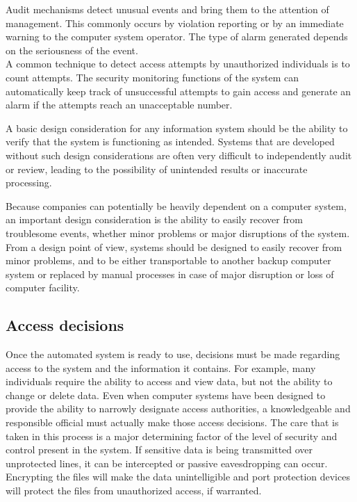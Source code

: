 \begin{htmllist}
    
    Audit mechanisms detect unusual events and bring them to the attention
    of management. This commonly occurs by violation reporting or by an
    immediate warning to the computer system operator. The type of alarm
    generated depends on the seriousness of the event.\\
    
    A common technique to detect access attempts by unauthorized
    individuals is to count attempts. The security monitoring functions of
    the system can automatically keep track of unsuccessful attempts to
    gain access and generate an alarm if the attempts reach an unacceptable
    number.


    
    A basic design consideration for any information system should be the
    ability to verify that the system is functioning as intended. Systems
    that are developed without such design considerations are often very
    difficult to independently audit or review, leading to the possibility
    of unintended results or inaccurate processing.


    
    Because companies can potentially be heavily dependent on a computer
    system, an important design consideration is the ability to easily
    recover from troublesome events, whether minor problems or major
    disruptions of the system. From a design point of view, systems should
    be designed to easily recover from minor problems, and to be either
    transportable to another backup computer system or replaced by manual
    processes in case of major disruption or loss of computer facility.
\end{htmllist}

\subsection{Access decisions}
Once the automated system is ready to use, decisions must be made
regarding access to the system and the information it contains. For
example, many individuals require the ability to access and view data,
but not the ability to change or delete data. Even when computer
systems have been designed to provide the ability to narrowly designate
access authorities, a knowledgeable and responsible official must
actually make those access decisions. The care that is taken in this
process is a major determining factor of the level of security and
control present in the system. If sensitive data is being transmitted
over unprotected lines, it can be intercepted or passive eavesdropping
can occur. Encrypting the files will make the data unintelligible and
port protection devices will protect the files from unauthorized
access, if warranted.


